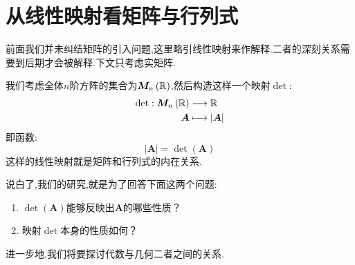 \section{从线性映射看矩阵与行列式}
前面我们并未纠结矩阵的引入问题,这里略引线性映射来作解释.二者的深刻关系需要到后期才会被解释.下文只考虑实矩阵.

我们考虑全体$n$阶方阵的集合为$
    \bm{M}_n\left(\mathbb{R}
    \right)$,然后构造这样一个映射$\det$:
\begin{align*}
    \det : \bm{M}_n\left(\mathbb{R}
    \right) & \longrightarrow
    \mathbb{R}                    \\
    \bm{A}  & \longmapsto
    \left|\bm{A}\right|
\end{align*}
即函数:
\[
    \left|\bm{A}\right| =  \det\left(\bm{A}\right)
\]
这样的线性映射就是矩阵和行列式的内在关系.

说白了,我们的研究,就是为了回答下面这两个问题:
\begin{enumerate}[label =\textup{(\arabic*)}]
    \item $\det\left(\bm{A}\right)$能够反映出$\bm{A}$的哪些性质？
    \item 映射$\det$本身的性质如何？
\end{enumerate}

进一步地,我们将要探讨代数与几何二者之间的关系.